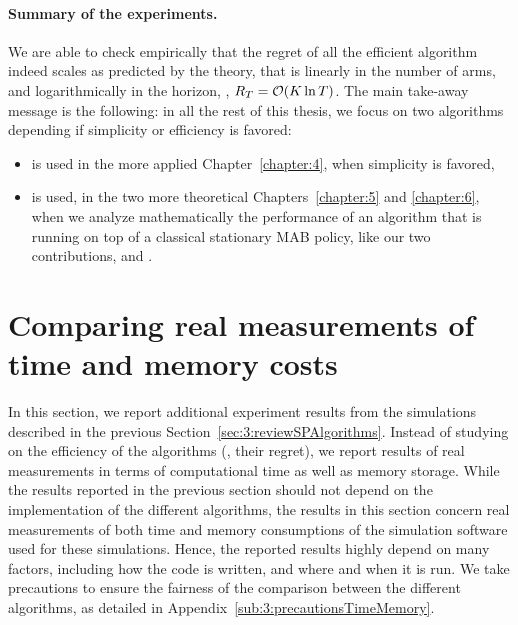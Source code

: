\paragraph{Summary of the experiments.}
%
We are able to check empirically that the regret of all the efficient algorithm indeed scales as predicted by the theory, that is
linearly in the number of arms, and logarithmically in the horizon, \ie, $R_T = \mathop{}\mathopen{}\mathcal{O}\mathopen{}\left(K \ln T\right)$.
%
The main take-away message is the following: in all the rest of this thesis, we focus on two algorithms depending if simplicity or efficiency is favored:
\begin{itemize}%
    \item
    \UCB{} is used in the more applied Chapter~\ref{chapter:4}, when simplicity is favored,
    \item
    \klUCB{} is used, in the two more theoretical Chapters~\ref{chapter:5} and \ref{chapter:6}, when we analyze mathematically the performance of an algorithm that is running on top of a classical stationary MAB policy, like our two contributions, \MCTopM{} and \GLR.
\end{itemize}

\newpage


\section{Comparing real measurements of time and memory costs}
\label{sec:3:timeAndMemoryCosts}

In this section, we report additional experiment results from the simulations described in the previous Section~\ref{sec:3:reviewSPAlgorithms}.
Instead of studying on the efficiency of the algorithms (\ie, their regret), we report results of real measurements in terms of computational time as well as memory storage.
%
%
While the results reported in the previous section should not depend on the implementation of the different algorithms, the results in this section concern real measurements of both time and memory consumptions of the simulation software used for these simulations.
Hence, the reported results highly depend on many factors, including how the code is written, and where and when it is run.
We take precautions to ensure the fairness of the comparison between the different algorithms, as detailed in Appendix~\ref{sub:3:precautionsTimeMemory}.


